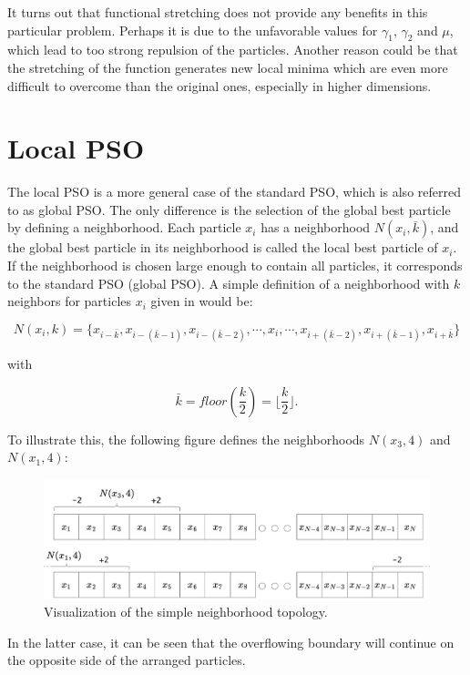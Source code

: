 \documentclass[
  oneside, a4paper, 12pt, openany]{book}
\theoremstyle{definition}
\theoremstyle{definition}
\theoremstyle{definition}
\theoremstyle{definition}
\theoremstyle{remark}
\begin{document}
It turns out that functional stretching does not provide any benefits in this particular problem. Perhaps it is due to the unfavorable values for \(\gamma_1\), \(\gamma_2\) and \(\mu\), which lead to too strong repulsion of the particles. Another reason could be that the stretching of the function generates new local minima which are even more difficult to overcome than the original ones, especially in higher dimensions.

\hypertarget{local-pso}{%
\section{Local PSO}\label{local-pso}}

The local PSO is a more general case of the standard PSO, which is also referred to as global PSO. The only difference is the selection of the global best particle by defining a neighborhood. Each particle \(x_i\) has a neighborhood \(N(x_i, \bar{k})\), and the global best particle in its neighborhood is called the local best particle of \(x_i\). If the neighborhood is chosen large enough to contain all particles, it corresponds to the standard PSO (global PSO). A simple definition of a neighborhood with \(k\) neighbors for particles \(x_i\) given in \citep{Enge2013} would be:

\[
  N(x_i, k) = \{ x_{i-\bar{k}}, x_{i-(\bar{k}-1)}, x_{i-(\bar{k}-2)}, \cdots, x_{i}, \cdots, x_{i+(\bar{k}-2)}, x_{i+(\bar{k}-1)}, x_{i+\bar{k}} \}
\]

with

\[
  \bar{k} = floor(\frac{k}{2}) = \lfloor \frac{k}{2} \rfloor.
\]

To illustrate this, the following figure defines the neighborhoods \(N(x_3, 4)\) and \(N(x_1, 4)\):

\begin{figure}
\centering
\includegraphics{img/PSO_local_chart4444.png}
\caption{Visualization of the simple neighborhood topology.}
\end{figure}

In the latter case, it can be seen that the overflowing boundary will continue on the opposite side of the arranged particles.
\end{document}
